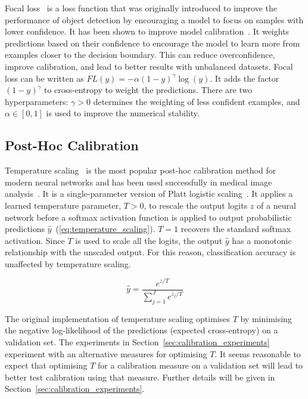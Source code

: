 Focal loss~\citep{lin2017focal} is a loss function that was originally introduced to improve the performance of object detection by encouraging a model to focus on samples with lower confidence. It has been shown to improve model calibration~\citep{mukhoti2020calibrating}. It weights predictions based on their confidence to encourage the model to learn more from examples closer to the decision boundary. This can reduce overconfidence, improve calibration, and lead to better results with unbalanced datasets. Focal loss can be written as $FL(y) = -\alpha(1-y)^\gamma\log(y)$. It adds the factor $(1-y)^\gamma$ to cross-entropy to weight the predictions. There are two hyperparameters: $\gamma>0$ determines the weighting of less confident examples, and $\alpha \in [0, 1]$ is used to improve the numerical stability.


\subsection{Post-Hoc Calibration}
Temperature scaling~\citep{guo2017calibration} is the most popular post-hoc calibration method for modern neural networks and has been used successfully in medical image analysis~\citep{liang2020improved}. It is a single-parameter version of Platt logistic scaling~\citep{platt1999probabilistic}. It applies a learned temperature parameter, $T > 0$, to rescale the output logits $z$ of a neural network before a softmax activation function is applied to output probabilistic predictions $\hat{y}$~(\ref{eq:temperature_scaling}). $T=1$ recovers the standard softmax activation. Since $T$ is used to scale all the logits, the output $\hat{y}$ has a monotonic relationship with the unscaled output. For this reason, classification accuracy is unaffected by temperature scaling.

\begin{equation}
	\hat{y} = \frac{e^{z/T}}{\sum^{J}_{j=1}e^{z_j/T}}
	\label{eq:temperature_scaling}
\end{equation}

The original implementation of temperature scaling optimises $T$ by minimising the negative log-likelihood of the predictions (expected cross-entropy) on a validation set. The experiments in Section~\ref{sec:calibration_experiments} experiment with an alternative measures for optimising $T$. It seems reasonable to expect that optimising $T$ for a calibration measure on a validation set will lead to better test calibration using that measure. Further details will be given in Section~\ref{sec:calibration_experiments}.


